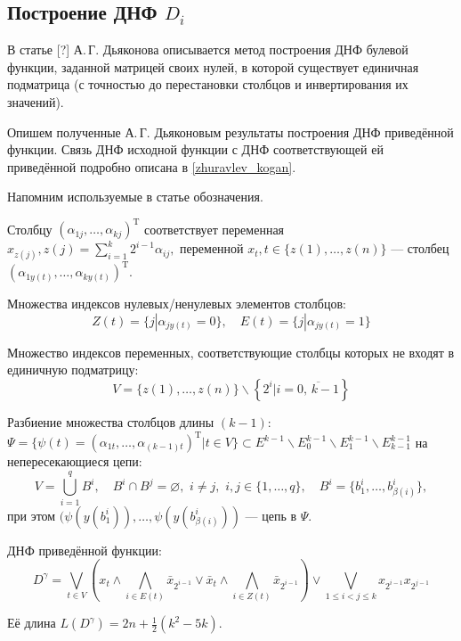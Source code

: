 \documentclass[12pt,a4paper,oneside,fleqn,leqno]{article}
\theoremstyle{definition}
\begin{document}
		\subsection{Построение ДНФ $D_i$} \label{dj}
			В статье [?] А.\,Г. Дьяконова описывается метод построения ДНФ булевой функции, заданной матрицей своих нулей, в которой существует единичная подматрица (с точностью до перестановки столбцов и инвертирования их значений).\par
			Опишем полученные А.\,Г. Дьяконовым результаты построения ДНФ приведённой функции. Связь ДНФ исходной функции с ДНФ соответствующей ей приведённой подробно описана в \ref{zhuravlev_kogan}.\par
			Напомним используемые в статье обозначения.\par
			Столбцу $(\alpha_{1j}, \ldots, \alpha_{kj})^{\text{T}}$ соответствует переменная $x_{z(j)}, z(j) = \sum\limits_{i = 1}^k 2^{i - 1}\alpha_{ij},$ переменной $x_t, t\in \{z(1),\ldots,z(n)\}$ --- столбец $(\alpha_{1y(t)}, \ldots, \alpha_{ky(t)})^{\text{T}}.$\par
			Множества индексов нулевых/ненулевых элементов столбцов:
			$$
				Z(t) = \{j | \alpha_{jy(t)} = 0\},\quad E(t) = \{j | \alpha_{jy(t)} = 1\}
			$$\par
			Множество индексов переменных, соответствующие столбцы которых не входят в единичную подматрицу:
			$$
				V = \{z(1), \ldots, z(n)\} \backslash \left\{2^i | i = \overline{0,\,k - 1}\right\}
			$$\par
			Разбиение множества столбцов длины $(k - 1)$: $\Psi = \{\psi(t) = (\alpha_{1t}, \ldots, \alpha_{(k - 1) t})^{\text{T}} | t \in V\} \subset E^{k - 1}\backslash E^{k - 1}_0\backslash E^{k - 1}_1 \backslash E^{k - 1}_{k - 1}$ на непересекающиеся цепи:
			$$
				V = \bigcup_{i = 1}^qB^i,\quad B^i\cap B^j = \varnothing,\,\,i \neq j,\,\,i,j \in \{1,\ldots,q\},\quad B^i = \{b^i_1,\ldots, b^i_{\beta(i)} \},
			$$
			при этом $(\psi(y(b^i_1)), \ldots, \psi(y(b^i_{\beta(i)}))$ --- цепь в $\Psi.$\par
			ДНФ приведённой функции:
			$$
				D^{\gamma} = \bigvee_{t  \in V} \left(x_t \wedge \bigwedge_{i \in E(t)} \bar{x}_{2^{i - 1}} \vee \bar{x}_t \wedge \bigwedge_{i \in Z(t)} \bar{x}_{2^{i - 1}}\right) \vee \bigvee_{1 \leqslant i < j \leqslant k} x_{2^{i - 1}} x_{2^{j - 1}}
			$$\par
			Её длина $L(D^{\gamma}) = 2n + \frac{1}{2}(k^2 - 5k).$\par
			
\end{document}
